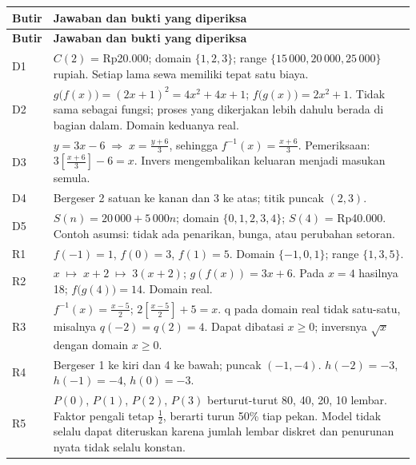 \documentclass[11pt,a4paper]{article}
\begin{document}
{\small\setlength{\tabcolsep}{2mm}\renewcommand{\arraystretch}{1.35}\begin{longtable}{|>{\raggedright\arraybackslash}p{16.677mm}|>{\raggedright\arraybackslash}p{152.873mm}|}\hline
\rowcolor{gray!10}\textbf{Butir} & \textbf{Jawaban dan bukti yang diperiksa}\\ \hline
\endfirsthead
\rowcolor{gray!10}\textbf{Butir} & \textbf{Jawaban dan bukti yang diperiksa}\\ \hline
\endhead
D1 & \(C(2)\) = Rp20.000; domain \(\{1, 2, 3\}\); range \(\{15\,000, 20\,000, 25\,000\}\) rupiah. Setiap lama sewa memiliki tepat satu biaya.\\ \hline
D2 & \(g\bigl(f(x)\bigr)=(2x+1)^2=4x^2+4x+1\); \(f\bigl(g(x)\bigr)=2x^2+1\). Tidak sama sebagai fungsi; proses yang dikerjakan lebih dahulu berada di bagian dalam. Domain keduanya real.\\ \hline
D3 & \(y=3x-6\;\Longrightarrow\;x=\frac{y+6}{3}\), sehingga \(f^{-1}(x)=\frac{x+6}{3}\). Pemeriksaan: \(3\left[\frac{x+6}{3}\right]-6=x\). Invers mengembalikan keluaran menjadi masukan semula.\\ \hline
D4 & Bergeser 2 satuan ke kanan dan 3 ke atas; titik puncak \((2, 3)\).\\ \hline
D5 & \(S(n) = 20\,000 + 5\,000n\); domain \(\{0, 1, 2, 3, 4\}\); \(S(4)\) = Rp40.000. Contoh asumsi: tidak ada penarikan, bunga, atau perubahan setoran.\\ \hline
R1 & \(f(-1) = 1\), \(f(0) = 3\), \(f(1) = 5\). Domain \(\{-1, 0, 1\}\); range \(\{1, 3, 5\}\).\\ \hline
R2 & \(x\;\longmapsto\;x+2\;\longmapsto\;3(x+2)\); \(g(f(x)) = 3x + 6\). Pada \(x = 4\) hasilnya 18; \(f\bigl(g(4)\bigr)=14\). Domain real.\\ \hline
R3 & \(f^{-1}(x)=\frac{x-5}{2}\); \(2\left[\frac{x-5}{2}\right]+5=x\). q pada domain real tidak satu-satu, misalnya \(q(-2)=q(2)=4\). Dapat dibatasi \(x \geq  0\); inversnya \(\sqrt{x}\) dengan domain \(x \geq  0\).\\ \hline
R4 & Bergeser 1 ke kiri dan 4 ke bawah; puncak \((-1, -4)\). \(h(-2) = -3\), \(h(-1) = -4\), \(h(0) = -3\).\\ \hline
R5 & \(P(0)\), \(P(1)\), \(P(2)\), \(P(3)\) berturut-turut 80, 40, 20, 10 lembar. Faktor pengali tetap \(\frac{1}{2}\), berarti turun 50\% tiap pekan. Model tidak selalu dapat diteruskan karena jumlah lembar diskret dan penurunan nyata tidak selalu konstan.\\ \hline
\end{longtable}}\medskip
\end{document}
